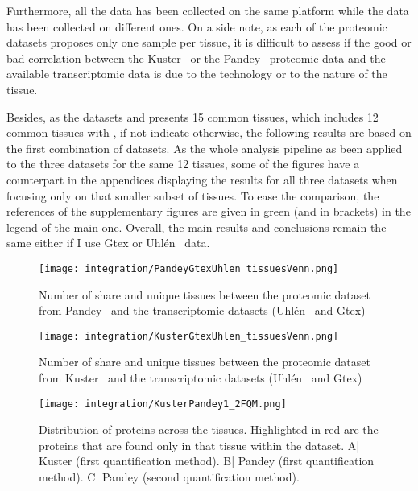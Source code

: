 Furthermore, all the  data has been
collected on the same platform while the  data has been
collected on different ones. On a side note, as each of the proteomic datasets
proposes only one sample per tissue, it is difficult to assess if the good or bad
correlation between the Kuster \etal\ or the Pandey \etal\ proteomic data
and the available transcriptomic data is due to the technology or
to the nature of the tissue.

Besides, as the datasets  and  presents 15 common
tissues, which includes 12 common tissues with , if not
indicate otherwise, the following results are based on the first combination of
datasets. As the whole analysis pipeline as been applied to the three datasets
for the same 12 tissues, some of the figures have a counterpart in the
appendices displaying the results for all three datasets when focusing only on
that smaller subset of tissues. To ease the comparison, the references of the
supplementary figures are given in green (and in brackets) in the legend of the
main one. Overall, the main results and conclusions remain the same either if
I use Gtex or Uhlén \etal\ data.




\begin{figure}[!htbp]
    \texttt{[image: integration/PandeyGtexUhlen\_tissuesVenn.png]}
    \centering
    \caption{\label{VennTissuePandeyGtexUhlen}Number of share and unique
    tissues between the proteomic dataset
    from Pandey \etal\ and the transcriptomic datasets (Uhlén \etal\ and Gtex)}
\end{figure}

\begin{figure}[!htbp]
    \texttt{[image: integration/KusterGtexUhlen\_tissuesVenn.png]}
    \centering
    \caption{\label{VennTissueKusterGtexUhlen}Number of share and unique
    tissues between the proteomic dataset
    from Kuster \etal\ and the transcriptomic datasets (Uhlén \etal\ and Gtex)}
\end{figure}


\begin{figure}[!htbp]
    \texttt{[image: integration/KusterPandey1\_2FQM.png]}\centering
    \caption{\label{KusterPandeyFQM}Distribution of proteins across the tissues.
    Highlighted in red are the proteins that are found only in that
    tissue within the dataset. A| Kuster (first quantification method).
    B| Pandey (first quantification method).
    C| Pandey (second quantification method).}
\end{figure}


